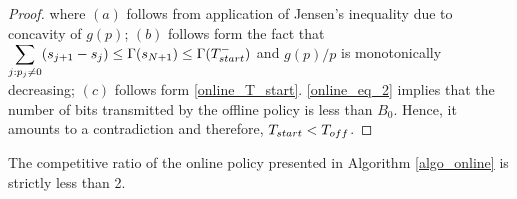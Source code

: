 \begin{proof}
where $(a)$ follows from application of Jensen's inequality due to concavity of $g(p)$; $(b)$ follows form the fact that $\displaystyle\sum_{j:p_j\neq 0}(s_{j+1}-s_{j})\le\TRx(s_{N+1})\le \TRx(T_{\mbox{\scriptsize{start}}}^-)$ and $g(p)/p$ is monotonically decreasing; $(c)$ follows form \eqref{online_T_start}. \eqref{online_eq_2} implies that the number of bits transmitted by the offline policy is less than $B_0$. Hence, it amounts to a contradiction and therefore, $T_{\mbox{\scriptsize{start}}}<T_{\mbox{\scriptsize{off}}}$.
\end{proof}



\begin{theorem}
The competitive ratio of the online policy presented in Algorithm \ref{algo_online} is strictly less than 2.
\end{theorem}
